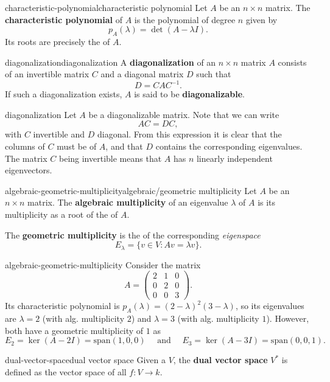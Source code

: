\begin{topic}{characteristic-polynomial}{characteristic polynomial}
    Let $A$ be an $n \times n$ matrix. The \textbf{characteristic polynomial} of $A$ is the polynomial of degree $n$ given by
    \[ p_A(\lambda) = \det(A - \lambda I) . \]
    Its roots are precisely the  of $A$.
\end{topic}

\begin{topic}{diagonalization}{diagonalization}
    A \textbf{diagonalization} of an $n \times n$ matrix $A$ consists of an invertible matrix $C$ and a diagonal matrix $D$ such that
    \[ D = C A C^{-1} . \]
    If such a diagonalization exists, $A$ is said to be \textbf{diagonalizable}.
\end{topic}

\begin{example}{diagonalization}
    Let $A$ be a diagonalizable matrix. Note that we can write
    \[ AC = DC , \]
    with $C$ invertible and $D$ diagonal. From this expression it is clear that the columns of $C$ must be  of $A$, and that $D$ contains the corresponding eigenvalues. The matrix $C$ being invertible means that $A$ has $n$ linearly independent eigenvectors.
\end{example}

\begin{topic}{algebraic-geometric-multiplicity}{algebraic/geometric multiplicity}
    Let $A$ be an $n \times n$ matrix. The \textbf{algebraic multiplicity} of an eigenvalue $\lambda$ of $A$ is its multiplicity as a root of the  of $A$.
    
    The \textbf{geometric multiplicity} is the  of the corresponding \textit{eigenspace}
    \[ E_\lambda = \{ v \in V : A v = \lambda v \} . \]
\end{topic}

\begin{example}{algebraic-geometric-multiplicity}
    Consider the matrix
    \[ A = \begin{pmatrix} 2 & 1 & 0 \\ 0 & 2 & 0 \\ 0 & 0 & 3 \end{pmatrix} . \]
    Its characteristic polynomial is $p_A(\lambda) = (2 - \lambda)^2 (3 - \lambda)$, so its eigenvalues are $\lambda = 2$ (with alg. multiplicity $2$) and $\lambda = 3$ (with alg. multiplicity $1$). However, both have a geometric multiplicity of $1$ as
    \[ E_2 = \ker(A - 2I) = \text{span}(1, 0, 0) \quad \text{ and } \quad E_3 = \ker(A - 3I) = \text{span}(0, 0, 1) . \]
\end{example}

\begin{topic}{dual-vector-space}{dual vector space}
    Given a  $V$, the \textbf{dual vector space} $V^*$ is defined as the vector space of all  $f : V \to k$.
\end{topic}
